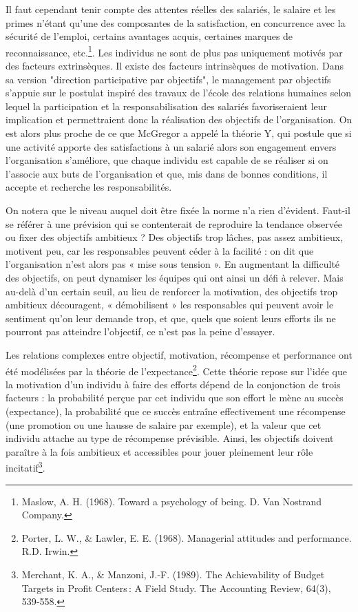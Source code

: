 \documentclass[oneside]{kaobook}
\begin{document}
Il faut cependant tenir compte des attentes réelles des salariés, le salaire et les primes n’étant qu’une des composantes de la satisfaction, en concurrence avec la sécurité de l’emploi, certains avantages acquis, certaines marques de reconnaissance, etc.\footnote{Maslow, A. H. (1968). Toward a psychology of being. D. Van Nostrand Company.}. Les individus ne sont de plus pas uniquement motivés par des facteurs extrinsèques. Il existe des facteurs intrinsèques de motivation. Dans sa version "direction participative par objectifs",  le management par objectifs s’appuie sur le postulat inspiré des travaux de l’école des relations humaines selon lequel la participation et la responsabilisation des salariés favoriseraient leur implication et permettraient donc la réalisation des objectifs de l’organisation. On est alors plus proche de ce que McGregor a appelé la théorie Y, qui postule que si une activité apporte des satisfactions à un salarié alors son engagement envers l'organisation s'améliore, que chaque individu est capable de se réaliser si on l'associe aux buts de l'organisation et que, mis dans de bonnes conditions, il accepte et recherche les responsabilités.

\begin{kaobox}
On notera que le niveau auquel doit être fixée la norme n’a rien d’évident. Faut-il se référer à une prévision qui se contenterait de reproduire la tendance observée ou fixer des objectifs ambitieux ? Des objectifs trop lâches, pas assez ambitieux, motivent peu, car les responsables peuvent céder à la facilité : on dit que l’organisation n’est alors pas « mise sous tension ». En augmentant la difficulté des objectifs, on peut dynamiser les équipes qui ont ainsi un défi à relever. Mais au-delà d’un certain seuil, au lieu de renforcer la motivation, des objectifs trop ambitieux découragent, « démobilisent » les responsables qui peuvent avoir le sentiment qu’on leur demande trop, et que, quels que soient leurs efforts ils ne pourront pas atteindre l’objectif, ce n’est pas la peine d’essayer.

Les relations complexes entre objectif, motivation, récompense et performance ont été modélisées par la théorie de l’expectance\footnote{Porter, L. W., \& Lawler, E. E. (1968). Managerial attitudes and performance. R.D. Irwin.}. Cette théorie repose sur l’idée que la motivation d’un individu à faire des efforts dépend de la conjonction de trois facteurs : la probabilité perçue par cet individu que son effort le mène au succès (expectance), la probabilité que ce succès entraîne effectivement une récompense (une promotion ou une hausse de salaire par exemple), et la valeur que cet individu attache au type de récompense prévisible. Ainsi, les objectifs doivent paraître à la fois ambitieux et accessibles pour jouer pleinement leur rôle incitatif\footnote{Merchant, K. A., \& Manzoni, J.-F. (1989). The Achievability of Budget Targets in Profit Centers : A Field Study. The Accounting Review, 64(3), 539‑558.}. 
\end{kaobox}
\end{document}

